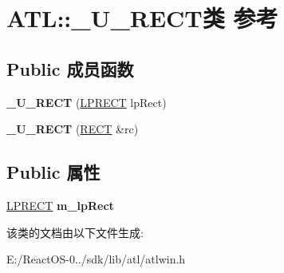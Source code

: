 \hypertarget{class_a_t_l_1_1___u___r_e_c_t}{}\section{A\+TL\+:\+:\+\_\+\+U\+\_\+\+R\+E\+C\+T类 参考}
\label{class_a_t_l_1_1___u___r_e_c_t}
\subsection*{Public 成员函数}
\begin{DoxyCompactItemize}
\item 
\mbox{\label{class_a_t_l_1_1___u___r_e_c_t_a8023ba9da0d5e884f22c8e7434f0863c}} 
{\bfseries \+\_\+\+U\+\_\+\+R\+E\+CT} (\hyperlink{structtag_r_e_c_t}{L\+P\+R\+E\+CT} lp\+Rect)
\item 
\mbox{\label{class_a_t_l_1_1___u___r_e_c_t_ab4e8662cfdd7747dd9f1e30aebd36f02}} 
{\bfseries \+\_\+\+U\+\_\+\+R\+E\+CT} (\hyperlink{structtag_r_e_c_t}{R\+E\+CT} \&rc)
\end{DoxyCompactItemize}
\subsection*{Public 属性}
\begin{DoxyCompactItemize}
\item 
\mbox{\label{class_a_t_l_1_1___u___r_e_c_t_a7d3b878b74203dee2f0c66eefada7eb0}} 
\hyperlink{structtag_r_e_c_t}{L\+P\+R\+E\+CT} {\bfseries m\+\_\+lp\+Rect}
\end{DoxyCompactItemize}


该类的文档由以下文件生成\+:\begin{DoxyCompactItemize}
\item 
E\+:/\+React\+O\+S-\/0../sdk/lib/atl/atlwin.\+h\end{DoxyCompactItemize}

